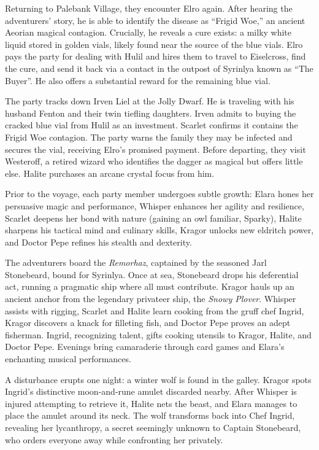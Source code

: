 \documentclass[
  letterpaper,12pt,twoside,twocolumn,openany,
  nodeprecatedcode,bg=full]{dndbook}
\begin{document}
Returning to Palebank Village, they encounter Elro again. After hearing
the adventurers' story, he is able to identify the disease as ``Frigid
Woe,'' an ancient Aeorian magical contagion. Crucially, he reveals a
cure exists: a milky white liquid stored in golden vials, likely found
near the source of the blue vials. Elro pays the party for dealing with
Hulil and hires them to travel to Eiselcross, find the cure, and send it
back via a contact in the outpost of Syrinlya known as ``The Buyer''. He
also offers a substantial reward for the remaining blue vial.

The party tracks down Irven Liel at the Jolly Dwarf. He is traveling
with his husband Fenton and their twin tiefling daughters. Irven admits
to buying the cracked blue vial from Hulil as an investment. Scarlet
confirms it contains the Frigid Woe contagion. The party warns the
family they may be infected and secures the vial, receiving Elro's
promised payment. Before departing, they visit Westeroff, a retired
wizard who identifies the dagger as magical but offers little else.
Halite purchases an arcane crystal focus from him.

Prior to the voyage, each party member undergoes subtle growth: Elara
hones her persuasive magic and performance, Whisper enhances her agility
and resilience, Scarlet deepens her bond with nature (gaining an owl
familiar, Sparky), Halite sharpens his tactical mind and culinary
skills, Kragor unlocks new eldritch power, and Doctor Pepe refines his
stealth and dexterity.

The adventurers board the \emph{Remorhaz}, captained by the seasoned
Jarl Stonebeard, bound for Syrinlya. Once at sea, Stonebeard drops his
deferential act, running a pragmatic ship where all must contribute.
Kragor hauls up an ancient anchor from the legendary privateer ship, the
\emph{Snowy Plover}. Whisper assists with rigging, Scarlet and Halite
learn cooking from the gruff chef Ingrid, Kragor discovers a knack for
filleting fish, and Doctor Pepe proves an adept fisherman. Ingrid,
recognizing talent, gifts cooking utensils to Kragor, Halite, and Doctor
Pepe. Evenings bring camaraderie through card games and Elara's
enchanting musical performances.

A disturbance erupts one night: a winter wolf is found in the galley.
Kragor spots Ingrid's distinctive moon-and-rune amulet discarded nearby.
After Whisper is injured attempting to retrieve it, Halite nets the
beast, and Elara manages to place the amulet around its neck. The wolf
transforms back into Chef Ingrid, revealing her lycanthropy, a secret
seemingly unknown to Captain Stonebeard, who orders everyone away while
confronting her privately.
\end{document}
